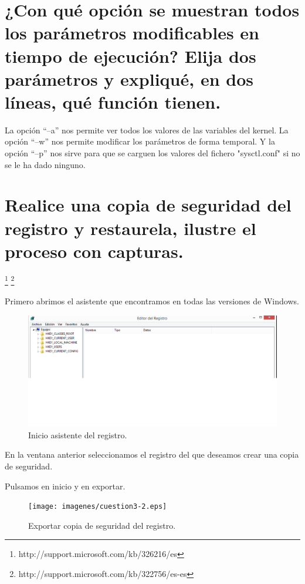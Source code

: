 \section{ ¿Con qué opción se muestran todos los parámetros modificables en tiempo de ejecución? Elija dos parámetros y expliqué, en dos líneas, qué función tienen.}

La opción “–a” nos permite ver todos los valores de las variables del kernel. 
La opción “–w” nos permite modificar los parámetros de forma temporal. 
Y la opción “–p” nos sirve para que se carguen los valores del fichero "sysctl.conf" si no 
se le ha dado ninguno.


\section{Realice una copia de seguridad del registro y restaurela, ilustre el proceso con capturas.}
\footnote{http://support.microsoft.com/kb/326216/es}
\footnote{http://support.microsoft.com/kb/322756/es-es}

Primero abrimos el asistente que encontramos en todas las versiones de Windows.

\begin{figure}[H]
\begin{center}
\includegraphics[scale=0.4]{imagenes/cuestion3-1.eps}
\caption{Inicio asistente del registro.}
\end{center}
\end{figure}

En la ventana anterior seleccionamos el registro del que deseamos crear una copia de seguridad.

Pulsamos en inicio y en exportar.
\begin{figure}[H]
\begin{center}
\texttt{[image: imagenes/cuestion3-2.eps]}
\caption{Exportar copia de seguridad del registro.}
\end{center}
\end{figure}

